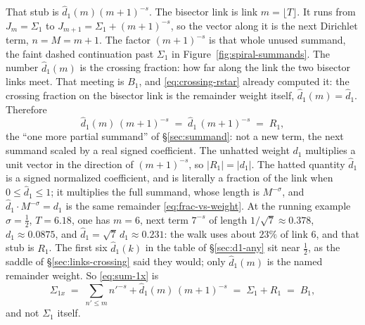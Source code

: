 \documentclass[11pt]{article}
\theoremstyle{definition}
\begin{document}
That stub is \(\hat d_1(m)(m+1)^{-s}\). The bisector link is link
\(m=\lfloor T\rfloor\). It runs from \(J_m=\Sigma_1\) to
\(J_{m+1}=\Sigma_1+(m+1)^{-s}\), so the vector along it is the next Dirichlet
term, \(n=M=m+1\). The factor \((m+1)^{-s}\) is that whole
unused summand, the faint dashed continuation past \(\Sigma_1\) in
Figure~\ref{fig:spiral-summands}. The number \(\hat d_1(m)\) is the crossing
fraction: how far along the link the two bisector links meet. That meeting is \(B_1\), and
\eqref{eq:crossing-rstar} already computed it: the crossing fraction on the
bisector link is the remainder weight itself,
\(\hat d_1(m)=\hat d_1\). Therefore
\begin{equation}\label{eq:sum-1x-remainder}
\hat d_1(m)\,(m+1)^{-s}
\;=\;
\hat d_1\,(m+1)^{-s}
\;=\;
R_{1},
\end{equation}
the ``one more partial summand'' of \S\ref{sec:summand}: not a new term, the
next summand scaled by a real signed coefficient. The unhatted weight \(d_1\)
multiplies a unit vector in the direction of \((m+1)^{-s}\), so
\(|R_{1}|=|d_1|\). The hatted quantity \(\hat d_1\) is a signed normalized
coefficient, and is literally a fraction of the link when
\(0\leq\hat d_1\leq1\); it multiplies the full summand, whose length is
\(M^{-\sigma}\), and
\(\hat d_1\cdot M^{-\sigma}=d_1\) is the same remainder
\eqref{eq:frac-vs-weight}. At the running example \(\sigma=\tfrac12\),
\(T=6.18\), one has \(m=6\), next term \(7^{-s}\) of length
\(1/\sqrt7\approx0.378\), \(d_1\approx0.0875\), and
\(\hat d_1=\sqrt7\,d_1\approx0.231\): the walk uses about \(23\%\) of link
\(6\), and that stub is \(R_{1}\). The first six \(\hat d_1(k)\) in the table of
\S\ref{sec:d1-any} sit near \(\tfrac12\), as the saddle of
\S\ref{sec:links-crossing} said they would; only \(\hat d_1(m)\) is the named
remainder weight. So \eqref{eq:sum-1x} is
\begin{equation}\label{eq:sum-1x-B1}
\Sigma_{1x}
\;=\;
\sum_{n'\le m}n'^{-s}+\hat d_1(m)\,(m+1)^{-s}
\;=\;
\Sigma_1+R_{1}
\;=\;
B_1,
\end{equation}
and not \(\Sigma_1\) itself.
\end{document}
